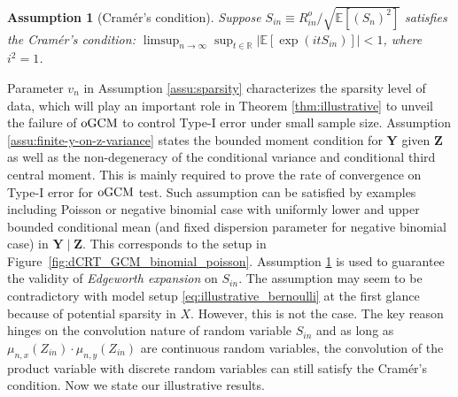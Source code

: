 \documentclass[12pt]{article}
\newtheorem{assumption}{Assumption}
\theoremstyle{definition}
\newcommand{\E}{\mathbb E}								%
\newcommand{\prz}{\bm Z}								%
\newcommand{\srz}{Z}									%
\newcommand{\pry}{{\bm Y}}								%
\newcommand{\oGCM}{\textnormal{oGCM}}						%
\begin{document}
\begin{assumption}[Cram\'er's condition]\label{assu:abs-cont}
	Suppose $S_{in}\equiv R_{in}^o/\sqrt{\E[(S_n)^2]}$ satisfies the Cram\'er's condition: $\limsup_{n\rightarrow\infty}\sup_{t\in\mathbb{R}}|\E[\exp(itS_{in})]|<1$, where $i^2=1$.
  \end{assumption}
Parameter $v_n$ in Assumption \ref{assu:sparsity} characterizes the sparsity level of data, which will play an important role in Theorem \ref{thm:illustrative} to unveil the failure of $\oGCM$ to control Type-I error under small sample size.  Assumption \ref{assu:finite-y-on-z-variance} states the bounded moment condition for $\pry$ given $\prz$ as well as the non-degeneracy of the conditional variance and conditional third central moment. This is mainly required to prove the rate of convergence on Type-I error for $\oGCM$ test. Such assumption can be satisfied by examples including Poisson or negative binomial case with uniformly lower and upper bounded conditional mean (and fixed dispersion parameter for negative binomial case) in $\pry\mid \prz$. This corresponds to the setup in Figure~\ref{fig:dCRT_GCM_binomial_poisson}. Assumption \ref{assu:abs-cont} is used to guarantee the validity of \textit{Edgeworth expansion} on $S_{in}$. The assumption may seem to be contradictory with model setup \eqref{eq:illustrative_bernoulli} at the first glance because of potential sparsity in $X$. However, this is not the case. The key reason hinges on the convolution nature of random variable $S_{in}$ and as long as $\mu_{n,x}(\srz_{in})\cdot \mu_{n,y}(\srz_{in})$ are continuous random variables, the convolution of the product variable with discrete random variables can still satisfy the Cram\'er's condition. Now we state our illustrative results.
\end{document}
